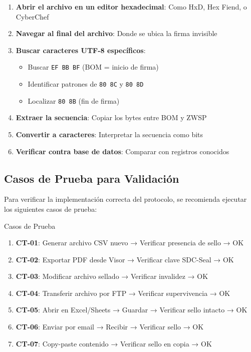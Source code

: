 \begin{enumerate}
\item \textbf{Abrir el archivo en un editor hexadecimal}: Como HxD, Hex Fiend, o CyberChef
\item \textbf{Navegar al final del archivo}: Donde se ubica la firma invisible
\item \textbf{Buscar caracteres UTF-8 específicos}:
   \begin{itemize}
   \item Buscar \texttt{EF BB BF} (BOM = inicio de firma)
   \item Identificar patrones de \texttt{80 8C} y \texttt{80 8D}
   \item Localizar \texttt{80 8B} (fin de firma)
   \end{itemize}
\item \textbf{Extraer la secuencia}: Copiar los bytes entre BOM y ZWSP
\item \textbf{Convertir a caracteres}: Interpretar la secuencia como bits
\item \textbf{Verificar contra base de datos}: Comparar con registros conocidos
\end{enumerate}


\subsection{Casos de Prueba para Validación}

Para verificar la implementación correcta del protocolo, se recomienda ejecutar los siguientes casos de prueba:

\begin{caja}{Casos de Prueba}
\begin{enumerate}
\item \textbf{CT-01}: Generar archivo CSV nuevo → Verificar presencia de sello → OK
\item \textbf{CT-02}: Exportar PDF desde Visor → Verificar clave SDC-Seal → OK
\item \textbf{CT-03}: Modificar archivo sellado → Verificar invalidez → OK
\item \textbf{CT-04}: Transferir archivo por FTP → Verificar supervivencia → OK
\item \textbf{CT-05}: Abrir en Excel/Sheets → Guardar → Verificar sello intacto → OK
\item \textbf{CT-06}: Enviar por email → Recibir → Verificar sello → OK
\item \textbf{CT-07}: Copy-paste contenido → Verificar sello en copia → OK
\end{enumerate}
\end{caja}

